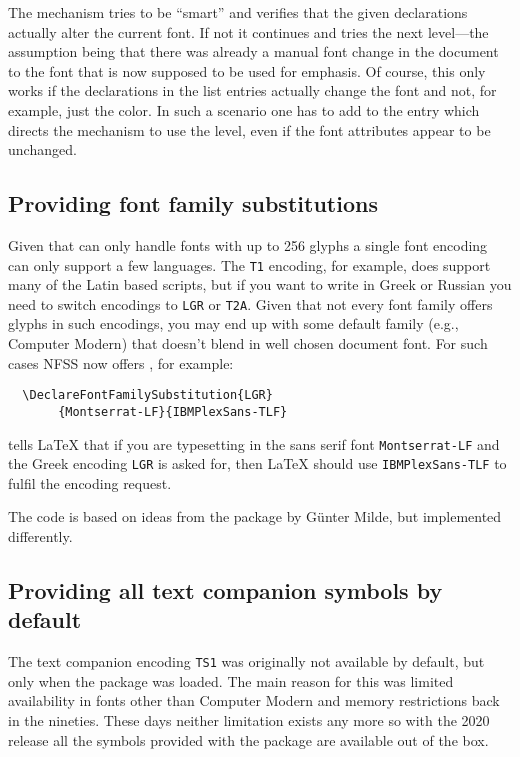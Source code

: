 \documentclass{ltnews}
\providecommand\pdfTeX{\hologo{pdfTeX}}
\begin{document}
The mechanism tries to be \enquote{smart} and verifies that the given
declarations actually alter the current font. If not it continues and
tries the next level---the assumption being that there was already a
manual font change in the document to the font that is now supposed to
be used for emphasis.
%
Of course, this only works if the declarations in the list entries
actually change the font and not, for example, just the color. In such
a scenario one has to add  to the entry which directs the
mechanism to use the level, even if the font attributes appear to be
unchanged.



\subsection{Providing font family substitutions}

Given that \pdfTeX{} can only handle fonts with up to 256 glyphs a
single font encoding can only support a few languages. The \texttt{T1}
encoding, for example, does support many of the Latin based scripts,
but if you want to write in Greek or Russian you need to switch
encodings to \texttt{LGR} or \texttt{T2A}. Given that not every font
family offers glyphs in such encodings, you may end up with some
default family (e.g., Computer Modern) that doesn’t blend in well
chosen document font.  For such cases NFSS now offers
, for example:
\begin{verbatim}
  \DeclareFontFamilySubstitution{LGR}
       {Montserrat-LF}{IBMPlexSans-TLF}
\end{verbatim}
tells \LaTeX{} that if you are typesetting in the sans serif font
\texttt{Montserrat-LF} and the Greek encoding \texttt{LGR} is asked
for, then \LaTeX{} should use \texttt{IBMPlexSans-TLF} to fulfil the
encoding request.

The code is based on ideas from the 
package by Günter Milde, but implemented differently.


\subsection{Providing all text companion symbols by default}

The text companion encoding \texttt{TS1} was originally not available
by default, but only when the  package was loaded. The
main reason for this was limited availability in fonts other than
Computer Modern and memory restrictions back in the nineties. These
days neither limitation exists any more so with the 2020 release all
the symbols provided with the  package are available out
of the box.
\end{document}
